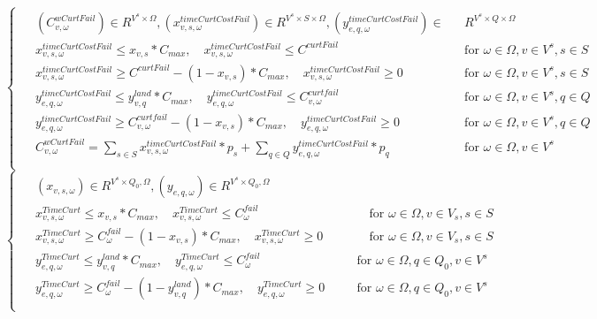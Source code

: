 \documentclass[a4paper,12pt]{article}
\begin{document}
    \begin{equation}
        \begin{cases}
            \begin{alignedat}{2}
                & (C_{v,\omega}^{wCurtFail}) \in R^{V^{s} \times \Omega}, (x_{v,s,\omega}^{timeCurtCostFail}) \in R^{V^{s} \times S \times \Omega},(y_{e,q, \omega}^{timeCurtCostFail}) \in && R^{V^{s} \times Q \times \Omega} \\
                & x_{v,s,\omega}^{timeCurtCostFail} \leq x_{v,s} * C_{max}, \quad x_{v,s,\omega}^{timeCurtCostFail} \leq C^{curtFail} && \text{for } \omega \in\Omega, v \in V^{s}, s \in S\\
                & x_{v,s,\omega}^{timeCurtCostFail} \geq C^{curtFail} - (1 - x_{v,s})*C_{max}, \quad x_{v,s,\omega}^{timeCurtCostFail} \geq 0 && \text{for } \omega \in\Omega, v \in V^{s}, s \in S\\
                & y_{e,q,\omega}^{timeCurtCostFail} \leq y_{v,q}^{land}*C_{max}, \quad y_{e,q,\omega}^{timeCurtCostFail} \leq C_{v,\omega}^{curtfail} && \text{for } \omega \in\Omega, v \in V^{s}, q \in Q\\
                & y_{e,q,\omega}^{timeCurtCostFail} \geq C_{v,\omega}^{curtfail} - (1 - x_{v,s})*C_{max}, \quad y_{e,q,\omega}^{timeCurtCostFail} \geq 0  && \text{for } \omega \in\Omega, v \in V^{s}, q \in Q\\
                & C_{v,\omega}^{wCurtFail} = \sum_{s \in S} x_{v,s, \omega}^{timeCurtCostFail}*p_{s} + \sum_{q \in Q} y_{e,q,\omega}^{timeCurtCostFail} * p_{q} && \text{for } \omega \in\Omega, v \in V^{s}\\
            \end{alignedat}
        \end{cases}
    \end{equation}
    \begin{equation}
        \begin{cases}
            \begin{alignedat}{2}
                & (x_{v,s,\omega}) \in R^{V^{s} \times Q_{0}, \Omega}, (y_{e,q,\omega}) \in R^{V^{s} \times Q_{0}, \Omega} \\
                & x_{v,s,\omega}^{TimeCurt} \leq x_{v,s}*C_{max}, \quad x_{v,s,\omega}^{TimeCurt} \leq C_{\omega}^{fail} &&\quad \text{for } \omega \in\Omega, v \in V_{s}, s \in S\\
                & x_{v,s,\omega}^{TimeCurt} \geq C_{\omega}^{fail}-(1-x_{v,s})*C_{max}, \quad x_{v,s,\omega}^{TimeCurt} \geq 0 &&\quad \text{for } \omega \in\Omega, v \in V_{s}, s \in S\\
                & y_{e,q,\omega}^{TimeCurt} \leq y_{v,q}^{land} * C_{max}, \quad y_{e,q,\omega}^{TimeCurt} \leq C_{\omega}^{fail} \quad && \text{for } \omega \in \Omega, q \in Q_{0}, v \in V^{s} \\
                & y_{e,q,\omega}^{TimeCurt} \geq C_{\omega}^{fail}-(1-y_{v,q}^{land})*C_{max}, \quad  y_{e,q,\omega}^{TimeCurt} \geq 0 \quad && \text{for } \omega \in\Omega, q \in Q_{0}, v \in V^{s}\\
            \end{alignedat}
        \end{cases}
    \end{equation}
\end{document}
